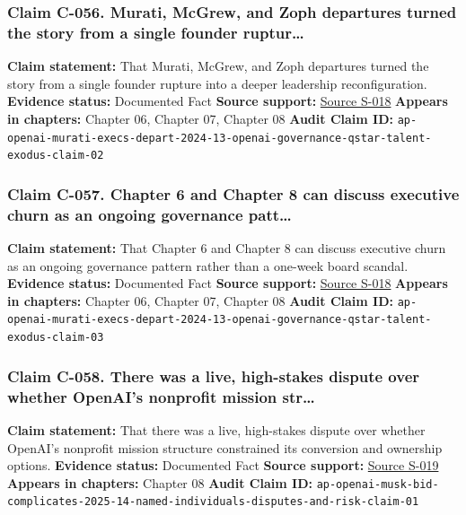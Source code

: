 \documentclass[
  american,
  11pt,
  letterpaper,
]{article}
\begin{document}
\subsubsection{Claim C-056. Murati, McGrew, and Zoph departures turned
the story from a single founder
ruptur\ldots{}}\label{claim-c-056-murati-mcgrew-and-zoph-departures-turned-the-story-from-a-single-founder-ruptur}

\textbf{Claim statement:} That Murati, McGrew, and Zoph departures
turned the story from a single founder rupture into a deeper leadership
reconfiguration. \textbf{Evidence status:} Documented Fact
\textbf{Source support:}
\hyperref[source-s-018-openai-chief-technology-officer-mira-murati-and-2-other-execs-are-leaving-the-chatgpt-maker]{Source
S-018} \textbf{Appears in chapters:} Chapter 06, Chapter 07, Chapter 08
\textbf{Audit Claim ID:}
\texttt{ap-openai-murati-execs-depart-2024-13-openai-governance-qstar-talent-exodus-claim-02}

\subsubsection{Claim C-057. Chapter 6 and Chapter 8 can discuss
executive churn as an ongoing governance
patt\ldots{}}\label{claim-c-057-chapter-6-and-chapter-8-can-discuss-executive-churn-as-an-ongoing-governance-patt}

\textbf{Claim statement:} That Chapter 6 and Chapter 8 can discuss
executive churn as an ongoing governance pattern rather than a one-week
board scandal. \textbf{Evidence status:} Documented Fact \textbf{Source
support:}
\hyperref[source-s-018-openai-chief-technology-officer-mira-murati-and-2-other-execs-are-leaving-the-chatgpt-maker]{Source
S-018} \textbf{Appears in chapters:} Chapter 06, Chapter 07, Chapter 08
\textbf{Audit Claim ID:}
\texttt{ap-openai-murati-execs-depart-2024-13-openai-governance-qstar-talent-exodus-claim-03}

\subsubsection{Claim C-058. There was a live, high-stakes dispute over
whether OpenAI's nonprofit mission
str\ldots{}}\label{claim-c-058-there-was-a-live-high-stakes-dispute-over-whether-openai-s-nonprofit-mission-str}

\textbf{Claim statement:} That there was a live, high-stakes dispute
over whether OpenAI's nonprofit mission structure constrained its
conversion and ownership options. \textbf{Evidence status:} Documented
Fact \textbf{Source support:}
\hyperref[source-s-019-how-elon-musk-97-4-billion-bid-complicates-matters-for-openai]{Source
S-019} \textbf{Appears in chapters:} Chapter 08 \textbf{Audit Claim ID:}
\texttt{ap-openai-musk-bid-complicates-2025-14-named-individuals-disputes-and-risk-claim-01}
\end{document}
